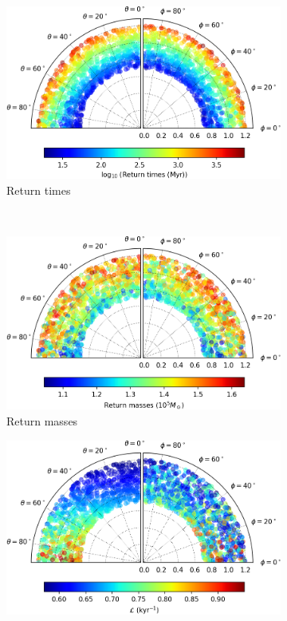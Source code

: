 \begin{figure}[h]
    \centering
    \begin{subfigure}[t]{0.4\textwidth}
        \includegraphics[width = \textwidth]{"../Files/Week 13/images/14_time"}
        \caption{Return times}
    \end{subfigure}
    ~ 
    \begin{subfigure}[t]{0.4\textwidth}
        \includegraphics[width=\textwidth]{"../Files/Week 13/images/14_mass"}
        \caption{Return masses}
    \end{subfigure}
    \begin{subfigure}[t]{0.4\textwidth}
        \includegraphics[width=\textwidth]{"../Files/Week 13/images/14_lyapunov"}

\end{subfigure}
\end{figure}
